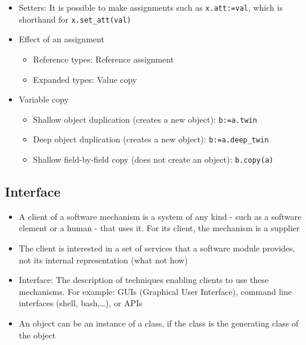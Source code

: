 \documentclass[a4paper]{article}
\newcommand{\inline}[1]{\lstinline!#1!}%
\begin{document}
\begin{itemize}
\begin{itemize}
\begin{itemize}
\end{itemize}
\end{itemize}
\item Setters: It is possible to make assignments such as \inline{x.att:=val}, which is shorthand for \inline{x.set_att(val)}
\item Effect of an assignment
\begin{itemize}
\item Reference types: Reference assignment
\item Expanded types: Value copy
\end{itemize}
\item Variable copy
\begin{itemize}
\item Shallow object duplication (creates a new object): \inline{b:=a.twin}
\item Deep object duplication (creates a new object): \inline{b:=a.deep_twin}
\item Shallow field-by-field copy (does not create an object): \inline{b.copy(a)}
\end{itemize}
\end{itemize}

\subsection{Interface}
\begin{itemize}
\item A client of a software mechanism is a system of any kind - such as a software element or a human - that uses it. For its client, the mechanism is a supplier
\item The client is interested in a set of services that a software module provides, not its internal representation (what not how)
\item Interface: The description of techniques enabling clients to use these mechanisms. For example: GUIs (Graphical User Interface), command line interfaces (shell, bash,\dots), or APIs
\item An object can be an instance of a class, if the class is the generating class of the object
\end{itemize}
\end{document}
